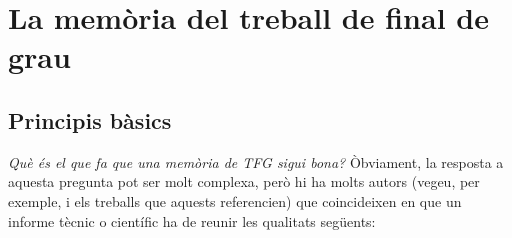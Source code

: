 
\chapter{La memòria del treball de final de grau}\label{memoria}

\section{Principis bàsics}

\emph{Què és el que fa que una memòria de \ac{TFG} sigui bona?} Òbviament, la resposta a aquesta pregunta pot ser molt complexa, però hi ha molts autors (vegeu, per exemple, \cite{Perelman01,Malvar08} i els treballs que aquests referencien) que coincideixen en que un informe tècnic o científic ha de reunir les qualitats següents:
